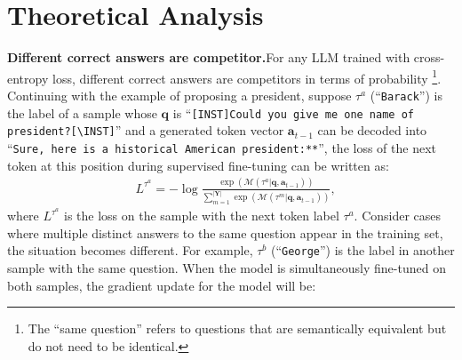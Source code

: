 \section{Theoretical Analysis}\label{sec:theoretical}

\textbf{Different correct answers are competitor.}\quad For any LLM trained with cross-entropy loss, different correct answers are competitors in terms of probability \footnote{The ``same question'' refers to questions that are semantically equivalent but do not need to be identical.}. Continuing with the example of proposing a president, suppose $\tau^{a}$ (``\texttt{Barack}'') is the label of a sample whose $\bm{q}$ is ``\texttt{[INST]Could you give me one name of president?[\textbackslash INST]}'' and a generated token vector $\bm{a}_{t-1}$  can be decoded into ``\texttt{Sure, here is a historical American president:**}'', the loss of the next token at this position during supervised fine-tuning can be written as:
\begin{equation}
\begin{aligned}
 &L^{\tau^a} = - \log \frac{\exp(\mathcal{M}({\tau^a}|\bm{q},\bm{a}_{t-1}))}{\sum_{m=1}^{|\bm{Y}|} \exp(\mathcal{M}(\tau^{m}|\bm{q},\bm{a}_{t-1}))} ,
\end{aligned}
\end{equation}
where $L^{\tau^a}$ is the loss on the sample with the next token label $\tau^{a}$.
Consider cases where multiple distinct answers to the same question appear in the training set, the situation becomes different. For example, $\tau^{b}$ (``\texttt{George}'') is the label in another sample with the same question. When the model is simultaneously fine-tuned on both samples, the gradient update for the model will be:

